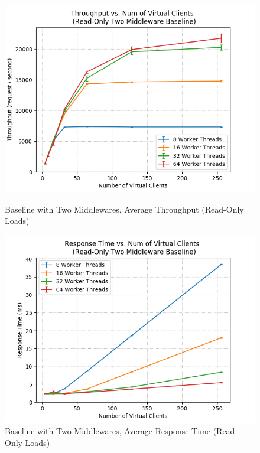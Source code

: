 \documentclass[11pt,a4paper]{article}
\begin{document}
\begin{figure}[H]
	\captionsetup{font=scriptsize,labelfont=scriptsize,justification=centering}
	\centering
	\begin{minipage}{0.5\textwidth}
		\centering
		\includegraphics[scale=0.525]{images/3b_two-mw_r-o_tps.png}
		\caption{Baseline with Two Middlewares, Average Throughput (Read-Only Loads)}
	\end{minipage}\hfill
	\begin{minipage}{0.5\textwidth}
		\centering
		\includegraphics[scale=0.525]{images/3b_two-mw_r-o_rt.png}
		\caption{Baseline with Two Middlewares, Average Response Time (Read-Only Loads)}
	\end{minipage}
\end{figure}
\end{document}
